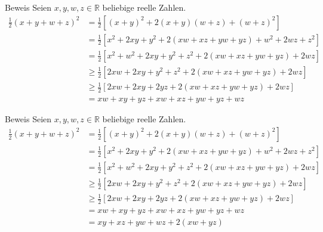\documentclass[10pt]{beamer}
\def\bR{\mathbb{R}}
\begin{document}
\begin{frame}{Beweis}
    Seien \( x, y, w, z \in \bR \) beliebige reelle Zahlen.
    \begin{align*}
        \frac{1}{2} \left( x + y + w + z \right)^{2}
        & = \frac{1}{2} \left[ \left( x + y \right)^{2} + 2 \left( x + y \right)\left( w + z \right) + \left( w + z \right)^{2} \right] \\
        & = \frac{1}{2} \left[ x^{2} + 2xy + y^{2} + 2 \left( xw + xz + yw + yz \right) + w^{2} + 2wz + z^{2} \right] \\
        & = \frac{1}{2} \left[ x^{2} + w^{2} + 2xy + y^{2} + z^{2} + 2 \left( xw + xz + yw + yz \right)  + 2wz \right] \\
        & \geq \frac{1}{2} \left[ 2xw + 2xy + y^{2} + z^{2} + 2 \left( xw + xz + yw + yz \right)  + 2wz \right] \\
        & \geq \frac{1}{2} \left[ 2xw + 2xy + 2yz + 2 \left( xw + xz + yw + yz \right)  + 2wz \right] \\
        & = xw + xy + yz + xw + xz + yw + yz + wz 
    \end{align*}
\end{frame}



\begin{frame}{Beweis}
    Seien \( x, y, w, z \in \bR \) beliebige reelle Zahlen.
    \begin{align*}
        \frac{1}{2} \left( x + y + w + z \right)^{2}
        & = \frac{1}{2} \left[ \left( x + y \right)^{2} + 2 \left( x + y \right)\left( w + z \right) + \left( w + z \right)^{2} \right] \\
        & = \frac{1}{2} \left[ x^{2} + 2xy + y^{2} + 2 \left( xw + xz + yw + yz \right) + w^{2} + 2wz + z^{2} \right] \\
        & = \frac{1}{2} \left[ x^{2} + w^{2} + 2xy + y^{2} + z^{2} + 2 \left( xw + xz + yw + yz \right)  + 2wz \right] \\
        & \geq \frac{1}{2} \left[ 2xw + 2xy + y^{2} + z^{2} + 2 \left( xw + xz + yw + yz \right)  + 2wz \right] \\
        & \geq \frac{1}{2} \left[ 2xw + 2xy + 2yz + 2 \left( xw + xz + yw + yz \right)  + 2wz \right] \\
        & = xw + xy + yz + xw + xz + yw + yz + wz \\
        & = xy + xz + yw + wz + 2 \left( xw + yz \right)
    \end{align*}
\end{frame}
\end{document}
